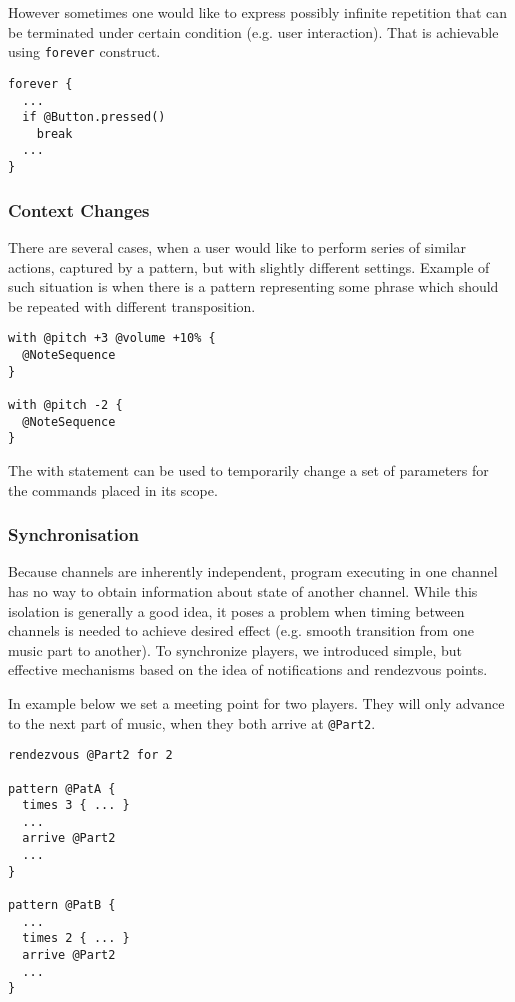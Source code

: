 \documentclass{article}
\begin{document}
However sometimes one would like to express possibly infinite repetition that
can be terminated under certain condition (e.g. user interaction). That is
achievable using {\tt forever} construct.

\begin{lstlisting}[caption=Infinite loop with break on user action]
forever {
  ...
  if @Button.pressed()
    break
  ...
}
\end{lstlisting}

\subsubsection{Context Changes}

There are several cases, when a user would like to perform series of similar
actions, captured by a pattern, but with slightly different settings. Example
of such situation is when there is a pattern representing some phrase which
should be repeated with different transposition.

\begin{lstlisting}[caption=Temporary parameters modification]
with @pitch +3 @volume +10% {
  @NoteSequence
}

with @pitch -2 {
  @NoteSequence
}
\end{lstlisting}

The with statement can be used to temporarily change a set of parameters for
the commands placed in its scope.

\subsubsection{Synchronisation}

Because channels are inherently independent, program executing in one channel
has no way to obtain information about state of another channel. While this
isolation is generally a good idea, it poses a problem when timing between
channels is needed to achieve desired effect (e.g. smooth transition from one
music part to another). To synchronize players, we introduced simple, but
effective mechanisms based on the idea of notifications and rendezvous points.

In example below we set a meeting point for two players. They will only advance
to the next part of music, when they both arrive at {\tt @Part2}.

\begin{lstlisting}[caption=Use of meeting points for synchronization]
rendezvous @Part2 for 2

pattern @PatA {
  times 3 { ... }
  ...
  arrive @Part2
  ...
}

pattern @PatB {
  ...
  times 2 { ... }
  arrive @Part2
  ...
}
\end{lstlisting}
\end{document}
